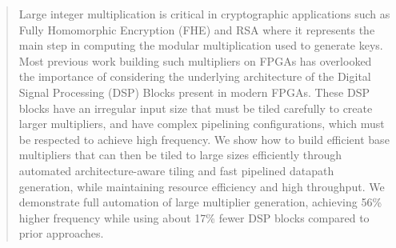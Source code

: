 \documentclass[conference]{IEEEtran}
\newif\ifshowcompiletime
\begin{document}



\pagestyle{fancy}
\fancyhf{} %
\renewcommand{\headrulewidth}{0pt} %
\fancyfoot[C]{\thepage} %
\ifshowcompiletime
  \fancyfoot[L]{\footnotesize Compiled: \mydate\today\ at \currenttime} %
\fi


\begin{abstract}
Large integer multiplication is critical in cryptographic applications such as Fully Homomorphic Encryption (FHE) and RSA where it represents the main step in computing the modular multiplication used to generate keys.
Most previous work building such multipliers on FPGAs has overlooked the importance of considering the underlying architecture of the Digital Signal Processing (DSP) Blocks present in modern FPGAs. 
These DSP blocks have an irregular input size that must be tiled carefully to create larger multipliers, and have complex pipelining configurations, which must be respected to achieve high frequency.
We show how to build efficient base multipliers that can then be tiled to large sizes efficiently through automated architecture-aware tiling and fast pipelined datapath generation, while maintaining resource efficiency and high throughput.
We demonstrate full automation of large multiplier generation, achieving 56\% higher frequency while using about 17\% fewer DSP blocks compared to prior approaches.
\end{abstract}

%
\IEEEpeerreviewmaketitle

\end{document}
